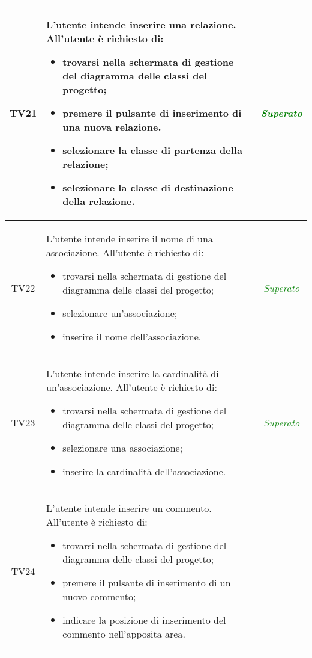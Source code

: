 \begin{longtable}{|c|>{}m{8cm}|c|}
\hypertarget{TV3.2}{TV21} & L'utente intende inserire una relazione.
All'utente è richiesto di:
\begin{itemize}
	\item trovarsi nella schermata di gestione del diagramma delle classi del progetto;
	\item premere il pulsante di inserimento di una nuova relazione.
	\item selezionare la classe di partenza della relazione;
	\item selezionare la classe di destinazione della relazione.
\end{itemize} & \textcolor{Green}{\textit{Superato}}\\ \hline

\hypertarget{TV3.2.1}{TV22} & L'utente intende inserire il nome di una associazione.
All'utente è richiesto di:
\begin{itemize}
	\item trovarsi nella schermata di gestione del diagramma delle classi del progetto;
	\item selezionare un'associazione;
	\item inserire il nome dell'associazione.
\end{itemize} & \textcolor{Green}{\textit{Superato}}\\ \hline

\hypertarget{TV3.2.7}{TV23} & L'utente intende inserire la cardinalità di un'associazione.
All'utente è richiesto di:
\begin{itemize}
	\item trovarsi nella schermata di gestione del diagramma delle classi del progetto;
	\item selezionare una associazione;
	\item inserire la cardinalità dell'associazione.
\end{itemize} & \textcolor{Green}{\textit{Superato}}\\ \hline

\hypertarget{TV3.3}{TV24} & L'utente intende inserire un commento. 
All'utente è richiesto di: 
\begin{itemize} 
	\item trovarsi nella schermata di gestione del diagramma delle classi del progetto;
	\item premere il pulsante di inserimento di un nuovo commento;
	\item indicare la posizione di inserimento del commento nell'apposita area.
	

\end{itemize}
\end{longtable}
